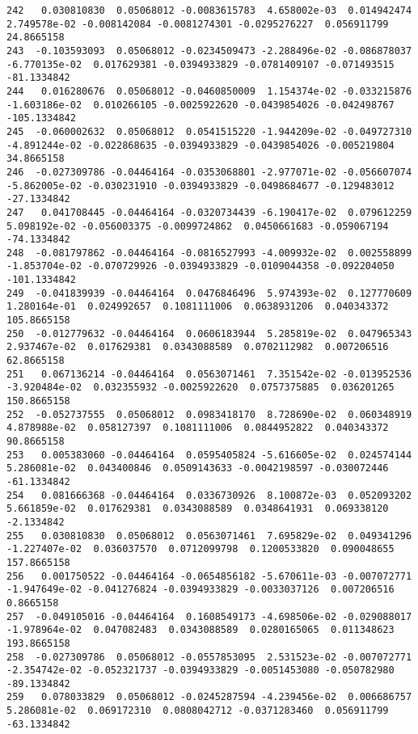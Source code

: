 \documentclass[15pt,a4paper,openright]{article}
\begin{document}
\begin{lstlisting}[language=AMPL, caption = data file]
242   0.030810830  0.05068012 -0.0083615783  4.658002e-03  0.014942474  2.749578e-02 -0.008142084 -0.0081274301 -0.0295276227  0.056911799   24.8665158
243  -0.103593093  0.05068012 -0.0234509473 -2.288496e-02 -0.086878037 -6.770135e-02  0.017629381 -0.0394933829 -0.0781409107 -0.071493515  -81.1334842
244   0.016280676  0.05068012 -0.0460850009  1.154374e-02 -0.033215876 -1.603186e-02  0.010266105 -0.0025922620 -0.0439854026 -0.042498767 -105.1334842
245  -0.060002632  0.05068012  0.0541515220 -1.944209e-02 -0.049727310 -4.891244e-02 -0.022868635 -0.0394933829 -0.0439854026 -0.005219804   34.8665158
246  -0.027309786 -0.04464164 -0.0353068801 -2.977071e-02 -0.056607074 -5.862005e-02 -0.030231910 -0.0394933829 -0.0498684677 -0.129483012  -27.1334842
247   0.041708445 -0.04464164 -0.0320734439 -6.190417e-02  0.079612259  5.098192e-02 -0.056003375 -0.0099724862  0.0450661683 -0.059067194  -74.1334842
248  -0.081797862 -0.04464164 -0.0816527993 -4.009932e-02  0.002558899 -1.853704e-02 -0.070729926 -0.0394933829 -0.0109044358 -0.092204050 -101.1334842
249  -0.041839939 -0.04464164  0.0476846496  5.974393e-02  0.127770609  1.280164e-01  0.024992657  0.1081111006  0.0638931206  0.040343372  105.8665158
250  -0.012779632 -0.04464164  0.0606183944  5.285819e-02  0.047965343  2.937467e-02  0.017629381  0.0343088589  0.0702112982  0.007206516   62.8665158
251   0.067136214 -0.04464164  0.0563071461  7.351542e-02 -0.013952536 -3.920484e-02  0.032355932 -0.0025922620  0.0757375885  0.036201265  150.8665158
252  -0.052737555  0.05068012  0.0983418170  8.728690e-02  0.060348919  4.878988e-02  0.058127397  0.1081111006  0.0844952822  0.040343372   90.8665158
253   0.005383060 -0.04464164  0.0595405824 -5.616605e-02  0.024574144  5.286081e-02  0.043400846  0.0509143633 -0.0042198597 -0.030072446  -61.1334842
254   0.081666368 -0.04464164  0.0336730926  8.100872e-03  0.052093202  5.661859e-02  0.017629381  0.0343088589  0.0348641931  0.069338120   -2.1334842
255   0.030810830  0.05068012  0.0563071461  7.695829e-02  0.049341296 -1.227407e-02  0.036037570  0.0712099798  0.1200533820  0.090048655  157.8665158
256   0.001750522 -0.04464164 -0.0654856182 -5.670611e-03 -0.007072771 -1.947649e-02 -0.041276824 -0.0394933829 -0.0033037126  0.007206516    0.8665158
257  -0.049105016 -0.04464164  0.1608549173 -4.698506e-02 -0.029088017 -1.978964e-02  0.047082483  0.0343088589  0.0280165065  0.011348623  193.8665158
258  -0.027309786  0.05068012 -0.0557853095  2.531523e-02 -0.007072771 -2.354742e-02 -0.052321737 -0.0394933829 -0.0051453080 -0.050782980  -89.1334842
259   0.078033829  0.05068012 -0.0245287594 -4.239456e-02  0.006686757  5.286081e-02  0.069172310  0.0808042712 -0.0371283460  0.056911799  -63.1334842

\end{lstlisting}
\end{document}
